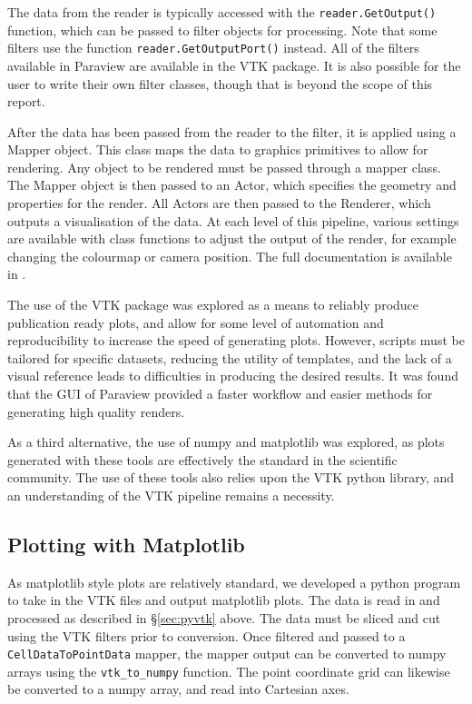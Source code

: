 \documentclass[preprint2]{aastex62}
\begin{document}
The data from the reader is typically accessed with the \verb|reader.GetOutput()| function, which can be passed to filter objects for processing. 
Note that some filters use the function \verb|reader.GetOutputPort()| instead.
All of the filters available in Paraview are available in the VTK package. 
It is also possible for the user to write their own filter classes, though that is beyond the scope of this report.

After the data has been passed from the reader to the filter, it is applied using a Mapper object. 
This class maps the data to graphics primitives to allow for rendering. Any object to be rendered must be passed through a mapper class.
The Mapper object is then passed to an Actor, which specifies the geometry and properties for the render. 
All Actors are then passed to the Renderer, which outputs a visualisation of the data. At each level of this pipeline, various settings are available with class functions to adjust the output of the render, for example changing the colourmap or camera position. The full documentation is available in \cite{avila2010vtk}.

The use of the VTK package was explored as a means to reliably produce publication ready plots, and allow for some level of automation and reproducibility to increase the speed of generating plots.
However, scripts must be tailored for specific datasets, reducing the utility of templates, and the lack of a visual reference leads to difficulties in producing the desired results. 
It was found that the GUI of Paraview provided a faster workflow and easier methods for generating high quality renders.

As a third alternative, the use of numpy and matplotlib was explored, as plots generated with these tools are effectively the standard in the scientific community. 
The use of these tools also relies upon the VTK python library, and an understanding of the VTK pipeline remains a necessity.

\subsection{Plotting with Matplotlib}
As matplotlib style plots are relatively standard, we developed a python program to take in the VTK files and output matplotlib plots.
The data is read in and processed as described in \S \ref{sec:pyvtk} above. 
The data must be sliced and cut using the VTK filters prior to conversion.
Once filtered and passed to a \verb|CellDataToPointData| mapper, the mapper output can be converted to numpy arrays using the \verb|vtk_to_numpy| function.
The point coordinate grid can likewise be converted to a numpy array, and read into Cartesian axes. 
\end{document}
